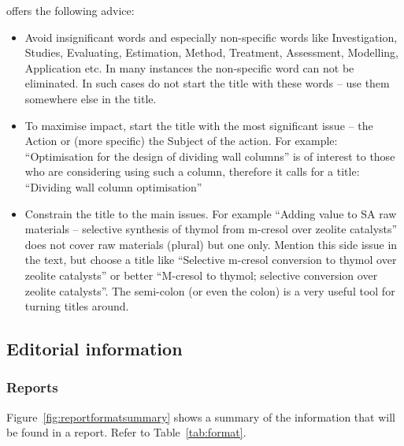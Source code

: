 \documentclass[a5paper, 10pt]{article}
\begin{document}
\citet{mandersloot} offers the following advice:
\begin{itemize}
\item Avoid insignificant words and especially non-specific words like
  Investigation, Studies, Evaluating, Estimation, Method, Treatment,
  Assessment, Modelling, Application etc. In many instances the
  non-specific word can not be eliminated. In such cases do not start
  the title with these words -- use them somewhere else in the title.

\item To maximise impact, start the title with the most significant
  issue -- the Action or (more specific) the Subject of the action.
  For example: ``Optimisation for the design of dividing wall columns''
  is of interest to those who are considering using such a column,
  therefore it calls for a title: ``Dividing wall column optimisation''

\item Constrain the title to the main issues. For example ``Adding
  value to SA raw materials -- selective synthesis of thymol from
  m-cresol over zeolite catalysts'' does not cover raw materials
  (plural) but one only. Mention this side issue in the text, but
  choose a title like ``Selective m-cresol conversion to thymol over
  zeolite catalysts'' or better ``M-cresol to thymol; selective
  conversion over zeolite catalysts''.  The semi-colon (or even the
  colon) is a very useful tool for turning titles around.
\end{itemize}

\subsection{Editorial information}

\subsubsection{Reports}
Figure~\ref{fig:reportformatsummary} shows a summary of the information that
will be found in a report.  Refer to Table~\ref{tab:format}.
\end{document}
